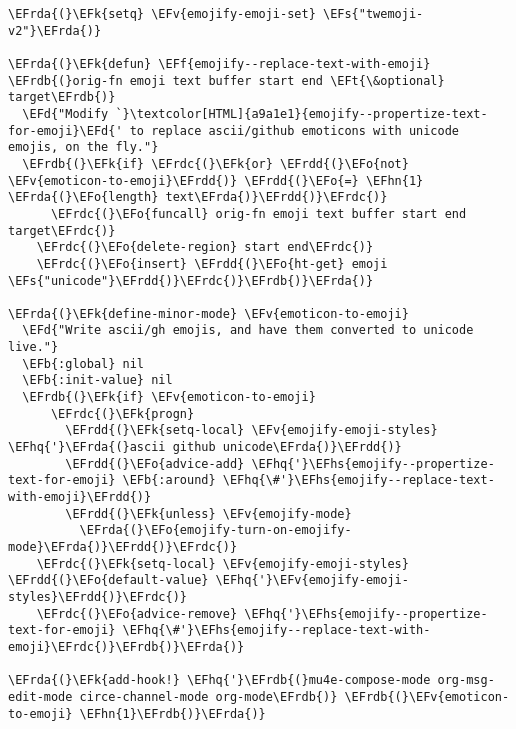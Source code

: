 \documentclass[a4wide,10pt]{article}
\newcommand{\EFs}[1]{\textcolor{EFs}{#1}} %
\newcommand{\EFd}[1]{\textcolor{EFd}{#1}} %
\newcommand{\EFk}[1]{\textcolor{EFk}{#1}} %
\newcommand{\EFb}[1]{\textcolor{EFb}{#1}} %
\newcommand{\EFf}[1]{\textcolor{EFf}{#1}} %
\newcommand{\EFv}[1]{\textcolor{EFv}{#1}} %
\newcommand{\EFt}[1]{\textcolor{EFt}{#1}} %
\newcommand{\EFo}[1]{\textcolor{EFo}{#1}} %
\newcommand{\EFhn}[1]{\textcolor{EFhn}{\textbf{#1}}} %
\newcommand{\EFhq}[1]{\textcolor{EFhq}{#1}} %
\newcommand{\EFhs}[1]{\textcolor{EFhs}{#1}} %
\newcommand{\EFrda}[1]{\textcolor{EFrda}{#1}} %
\newcommand{\EFrdb}[1]{\textcolor{EFrdb}{#1}} %
\newcommand{\EFrdc}[1]{\textcolor{EFrdc}{#1}} %
\newcommand{\EFrdd}[1]{\textcolor{EFrdd}{#1}} %
\begin{document}
\begin{Code}
\begin{Verbatim}
\EFrda{(}\EFk{setq} \EFv{emojify-emoji-set} \EFs{"twemoji-v2"}\EFrda{)}

\EFrda{(}\EFk{defun} \EFf{emojify--replace-text-with-emoji} \EFrdb{(}orig-fn emoji text buffer start end \EFt{\&optional} target\EFrdb{)}
  \EFd{"Modify `}\textcolor[HTML]{a9a1e1}{emojify--propertize-text-for-emoji}\EFd{' to replace ascii/github emoticons with unicode emojis, on the fly."}
  \EFrdb{(}\EFk{if} \EFrdc{(}\EFk{or} \EFrdd{(}\EFo{not} \EFv{emoticon-to-emoji}\EFrdd{)} \EFrdd{(}\EFo{=} \EFhn{1} \EFrda{(}\EFo{length} text\EFrda{)}\EFrdd{)}\EFrdc{)}
      \EFrdc{(}\EFo{funcall} orig-fn emoji text buffer start end target\EFrdc{)}
    \EFrdc{(}\EFo{delete-region} start end\EFrdc{)}
    \EFrdc{(}\EFo{insert} \EFrdd{(}\EFo{ht-get} emoji \EFs{"unicode"}\EFrdd{)}\EFrdc{)}\EFrdb{)}\EFrda{)}

\EFrda{(}\EFk{define-minor-mode} \EFv{emoticon-to-emoji}
  \EFd{"Write ascii/gh emojis, and have them converted to unicode live."}
  \EFb{:global} nil
  \EFb{:init-value} nil
  \EFrdb{(}\EFk{if} \EFv{emoticon-to-emoji}
      \EFrdc{(}\EFk{progn}
        \EFrdd{(}\EFk{setq-local} \EFv{emojify-emoji-styles} \EFhq{'}\EFrda{(}ascii github unicode\EFrda{)}\EFrdd{)}
        \EFrdd{(}\EFo{advice-add} \EFhq{'}\EFhs{emojify--propertize-text-for-emoji} \EFb{:around} \EFhq{\#'}\EFhs{emojify--replace-text-with-emoji}\EFrdd{)}
        \EFrdd{(}\EFk{unless} \EFv{emojify-mode}
          \EFrda{(}\EFo{emojify-turn-on-emojify-mode}\EFrda{)}\EFrdd{)}\EFrdc{)}
    \EFrdc{(}\EFk{setq-local} \EFv{emojify-emoji-styles} \EFrdd{(}\EFo{default-value} \EFhq{'}\EFv{emojify-emoji-styles}\EFrdd{)}\EFrdc{)}
    \EFrdc{(}\EFo{advice-remove} \EFhq{'}\EFhs{emojify--propertize-text-for-emoji} \EFhq{\#'}\EFhs{emojify--replace-text-with-emoji}\EFrdc{)}\EFrdb{)}\EFrda{)}

\EFrda{(}\EFk{add-hook!} \EFhq{'}\EFrdb{(}mu4e-compose-mode org-msg-edit-mode circe-channel-mode org-mode\EFrdb{)} \EFrdb{(}\EFv{emoticon-to-emoji} \EFhn{1}\EFrdb{)}\EFrda{)}
\end{Verbatim}
\end{Code}
\end{document}
